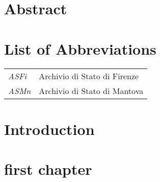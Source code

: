\documentclass[12pt,letterpaper,oneside,final]{memoir}
\makeatletter
\newcommand{\listofappendices}{\bgroup%
  \renewcommand\contentsname{List of Appendices}
  \let\@startoc@temp\@starttoc%
  \def\@starttoc##1{\@startoc@temp{app}}%
  \clearpage
  \tableofcontents* \egroup
}
\makeatother
\begin{document}

\newpage


\chapter{Abstract}
\DoubleSpacing
\noindent

\clearpage


\setcounter{tocdepth}{2} %

\begin{KeepFromToc}
\tableofcontents
\end{KeepFromToc}

\clearpage

\newpage

\clearpage


\listoffigures


\chapter{List of Abbreviations}

\SingleSpacing

\begin{longtable}{ll}

\emph{ASFi} & Archivio di Stato di Firenze\\ %
\emph{ASMn} & Archivio di Stato di Mantova\\ %
\end{longtable}

\clearpage


\listofappendices%
\DoubleSpacing
\mainmatter
\clearpage
\cleardoublepage  
{}

\chapter[Introduction]{Introduction}

\chapter{first chapter} %

\end{document}
